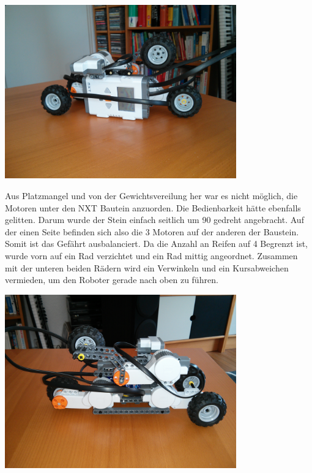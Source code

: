       \begin{capfigure}
	\includegraphics[width=10cm]{images/kletter1.jpg}
      \end{capfigure}
      
      Aus Platzmangel und von der Gewichtsvereilung her war es nicht möglich, die Motoren unter den NXT Bautein anzuorden. Die Bedienbarkeit hätte ebenfalls gelitten. Darum wurde der Stein einfach seitlich um 90 gedreht angebracht. Auf der einen Seite befinden sich also die 3 Motoren auf der anderen der Baustein. Somit ist das Gefährt ausbalanciert.
      Da die Anzahl an Reifen auf 4 Begrenzt ist, wurde vorn auf ein Rad verzichtet und ein Rad mittig angeordnet. Zusammen mit der unteren beiden Rädern wird ein Verwinkeln und ein Kursabweichen vermieden, um den Roboter gerade nach oben zu führen. 
            
      \begin{capfigure}
	\includegraphics[width=10cm]{images/kletter2.jpg}
      \end{capfigure}
      
